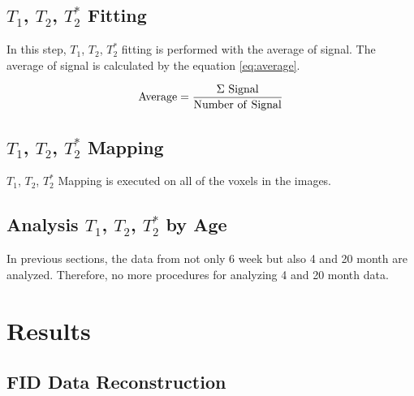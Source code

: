 \documentclass[10pt, a4paper]{article}
\begin{document}
		\subsection{$T_1$, $T_2$, $T_2^*$ Fitting}
			In this step, $T_1$, $T_2$, $T_2^*$ fitting is performed with the average of signal. The average of signal is calculated by the equation \ref{eq:average}.
			
			\begin{equation}
				\rm{Average} = \frac{\Sigma \ Signal}{\rm{Number \ of \ Signal}}
				\label{eq:average}
			\end{equation}
		
			
		
		\subsection{$T_1$, $T_2$, $T_2^*$ Mapping}
			$T_1$, $T_2$, $T_2^*$ Mapping is executed on all of the voxels in the images. 
		
			
		
		\subsection{Analysis $T_1$, $T_2$, $T_2^*$  by Age}
			In previous sections, the data from not only 6 week but also 4 and 20 month are analyzed. Therefore, no more procedures for analyzing 4 and 20 month data. 
	
	\section{Results}
		\subsection{FID Data Reconstruction}
\end{document}
